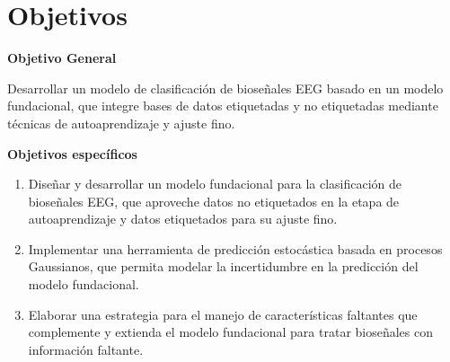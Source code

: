 \section{Objetivos}

\textbf{Objetivo General}

Desarrollar un modelo de clasificación de bioseñales EEG basado en un modelo fundacional, que integre bases de datos etiquetadas y no etiquetadas mediante técnicas de autoaprendizaje y ajuste fino.

\textbf{Objetivos específicos }

\begin{enumerate}
	\item Diseñar y desarrollar un modelo fundacional para la clasificación de bioseñales EEG, que aproveche datos no etiquetados en la etapa de autoaprendizaje y datos etiquetados para su ajuste fino.
	
	\item Implementar una herramienta de predicción estocástica basada en procesos Gaussianos, que permita modelar la incertidumbre en la predicción del modelo fundacional.
	
	\item Elaborar una estrategia para el manejo de características faltantes que complemente y extienda el modelo fundacional para tratar bioseñales con información faltante. 
\end{enumerate}